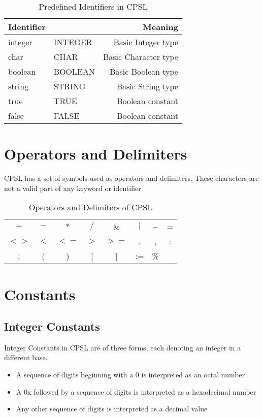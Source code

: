 \documentclass{book}
\begin{document}
\begin{table}[h!]
\begin{center}
\begin{tabular}{ll|r}
Identifier & & Meaning \\
\hline
integer & INTEGER & Basic Integer type \\
char & CHAR & Basic Character type \\
boolean & BOOLEAN & Basic Boolean type \\
string & STRING & Basic String type \\
true & TRUE & Boolean constant \\
false & FALSE & Boolean constant \\
\end{tabular}
\end{center}
\caption{Predefined Identifiers in CPSL}
\label{predefinedident}
\end{table}
\section{Operators and Delimiters}
CPSL has a set of symbols used as operators and delimiters.
These characters are not a valid part of any keyword or identifier.

\begin{table}[h!]
\begin{center}
\begin{tabular}{cccccccc}
$+$ & $-$ & $*$ & $/$ & \& & $|$ & \textasciitilde & = \\
$<>$ & $<$ & $<=$ & $>$ & $>=$ & . & , & : \\
; & ( & ) & [ & ] & := & \% &  \\

\end{tabular}
\end{center}
\caption{Operators and Delimiters of CPSL}
\end{table}
\section{Constants}
\subsection{Integer Constants}
Integer Constants in CPSL are of three forms, each denoting an integer in a different base.
\begin{itemize}
\item A sequence of digits beginning with a 0 is interpreted as an octal number
\item A 0x followed by a sequence of digits is interpreted as a hexadecimal number
\item Any other sequence of digits is interpreted as a decimal value
\end{itemize}
\end{document}
